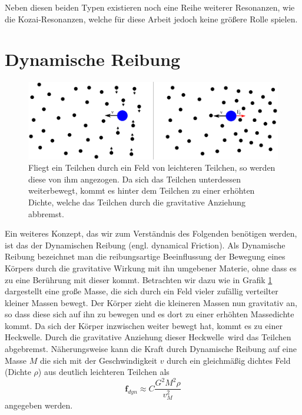 \documentclass[12pt,a4paper,twoside,open=right,bibliography=totoc]{scrbook}
\begin{document}
Neben diesen beiden Typen existieren noch eine Reihe weiterer Resonanzen, wie die Kozai-Resonanzen, welche für diese Arbeit jedoch keine größere Rolle spielen. %

\section{Dynamische Reibung}
\begin{figure}
\centering
\includegraphics[scale=0.4]{img/dynamischeReibung}
\caption{Fliegt ein Teilchen durch ein Feld von leichteren Teilchen, so werden diese von ihm angezogen. Da sich das Teilchen unterdessen weiterbewegt, kommt es hinter dem Teilchen zu einer erhöhten Dichte, welche das Teilchen durch die gravitative Anziehung abbremst.}
\label{fig:df}
\end{figure}
Ein weiteres Konzept, das wir zum Verständnis des Folgenden benötigen werden, ist das der Dynamischen Reibung (engl. dynamical Friction). Als Dynamische Reibung bezeichnet man die reibungsartige Beeinflussung der Bewegung eines Körpers durch die gravitative Wirkung mit ihn umgebener Materie, ohne dass es zu eine Berührung mit dieser kommt.
Betrachten wir dazu wie in Grafik \ref{fig:df} dargestellt eine große Masse, die sich durch ein Feld vieler zufällig verteilter kleiner Massen bewegt. Der Körper zieht die kleineren Massen nun gravitativ an, so dass diese sich auf ihn zu bewegen und es dort zu einer erhöhten Massedichte kommt. Da sich der Körper inzwischen weiter bewegt hat, kommt es zu einer \glqq Heckwelle\grqq. Durch die gravitative Anziehung dieser \glqq Heckwelle\grqq\ wird das Teilchen abgebremst.
Näherungsweise kann die Kraft durch Dynamische Reibung auf eine Masse $M$ die sich mit der Geschwindigkeit $v$ durch ein gleichmäßig dichtes Feld (Dichte $\rho$) aus deutlich leichteren Teilchen als
\begin{equation}\label{eq:df}
\textbf{f}_{dyn} \approx C \frac{G^2 M^2 \rho}{v^2_M}
\end{equation}
angegeben werden.
\end{document}
